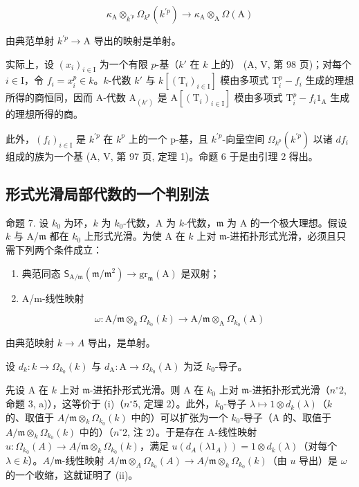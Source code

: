 \[
\kappa_ {\mathrm{A}} \otimes_ {k ^ {\prime p}} \Omega_ {k ^ {p}} (k ^ {\prime p}) \longrightarrow \kappa_ {\mathrm{A}} \otimes_ {\mathrm{A}} \Omega (\mathrm{A})
\]

由典范单射 \(k^{\prime p}\to \mathrm{A}\) 导出的映射是单射。

实际上，设 \((x_{i})_{i\in \mathrm{I}}\) 为一个有限 \(p\)-基（\(k'\) 在 \(k\) 上的） (A, V, 第 98 页)；对每个 \(i\in \mathrm{I}\)，令 \(f_{i} = x_{i}^{p}\in k\)。\(k\)-代数 \(k'\) 与 \(k[(\mathrm{T}_i)_{i\in \mathrm{I}}]\) 模由多项式 \(\mathrm{T}_i^p - f_i\) 生成的理想所得的商恒同，因而 A-代数 \(\mathrm{A}_{(k')}\) 是 \(\mathrm{A}[(\mathrm{T}_i)_{i\in \mathrm{I}}]\) 模由多项式 \(\mathrm{T}_i^p - f_i1_{\mathrm{A}}\) 生成的理想所得的商。

此外，\((f_{i})_{i\in\mathrm{I}}\) 是 \(k^{\prime p}\) 在 \(k^{p}\) 上的一个 p-基，且 \(k^{\prime p}\)-向量空间 \(\Omega_{k^{p}}(k^{\prime p})\) 以诸 \(df_{i}\) 组成的族为一个基 (A, V, 第 97 页, 定理 1)。命题 6 于是由引理 2 得出。

\subsection{形式光滑局部代数的一个判别法}

命题 7. 设 \(k_{0}\) 为环，\(k\) 为 \(k_{0}\)-代数，A 为 \(k\)-代数，\(\mathfrak{m}\) 为 A 的一个极大理想。假设 \(k\) 与 A/\(\mathfrak{m}\) 都在 \(k_{0}\) 上形式光滑。为使 A 在 \(k\) 上对 \(\mathfrak{m}\)-进拓扑形式光滑，必须且只需下列两个条件成立：

\begin{enumerate}
\def\labelenumi{(\roman{enumi})}
\item
  典范同态 \(\mathsf{S}_{\mathrm{A} / \mathfrak{m}}(\mathfrak{m} / \mathfrak{m}^{2})\to \mathrm{gr}_{\mathfrak{m}}(\mathrm{A})\) 是双射；
\item
  A/m-线性映射
\end{enumerate}

\[
\omega : \mathrm{A} / \mathfrak {m} \otimes_ {k} \Omega_ {k _ {0}} (k) \longrightarrow \mathrm{A} / \mathfrak {m} \otimes_ {\mathrm{A}} \Omega_ {k _ {0}} (\mathrm{A})
\]

由典范映射 \(k \to A\) 导出，是单射。

设 \(d_{k}:k\to \Omega_{k_{0}}(k)\) 与 \(d_{\mathrm{A}}:\mathrm{A}\to \Omega_{k_0}(\mathrm{A})\) 为泛 \(k_{0}\)-导子。

先设 A 在 \(k\) 上对 \(\mathfrak{m}\)-进拓扑形式光滑。则 A 在 \(k_{0}\) 上对 \(\mathfrak{m}\)-进拓扑形式光滑（\(n^{\circ} 2\), 命题 3, a)），这等价于 (i)（\(n^{\circ} 5\), 定理 2）。此外，\(k_{0}\)-导子 \(\lambda \mapsto 1 \otimes d_{k}(\lambda)\)（\(k\) 的、取值于 \(A/\mathfrak{m} \otimes_{k} \Omega_{k_{0}}(k)\) 中的）可以扩张为一个 \(k_{0}\)-导子（A 的、取值于 \(A/\mathfrak{m} \otimes_{k} \Omega_{k_{0}}(k)\) 中的）（\(n^{\circ} 2\), 注 2）。于是存在 A-线性映射 \(u: \Omega_{k_{0}}(A) \to A/\mathfrak{m} \otimes_{k} \Omega_{k_{0}}(k)\)，满足 \(u(d_{A}(\lambda 1_{A})) = 1 \otimes d_{k}(\lambda)\)（对每个 \(\lambda \in k\)）。\(A/\mathfrak{m}\)-线性映射 \(A/\mathfrak{m} \otimes_{A} \Omega_{k_{0}}(A) \longrightarrow A/\mathfrak{m} \otimes_{k} \Omega_{k_{0}}(k)\)（由 \(u\) 导出）是 \(\omega\) 的一个收缩，这就证明了 (ii)。

